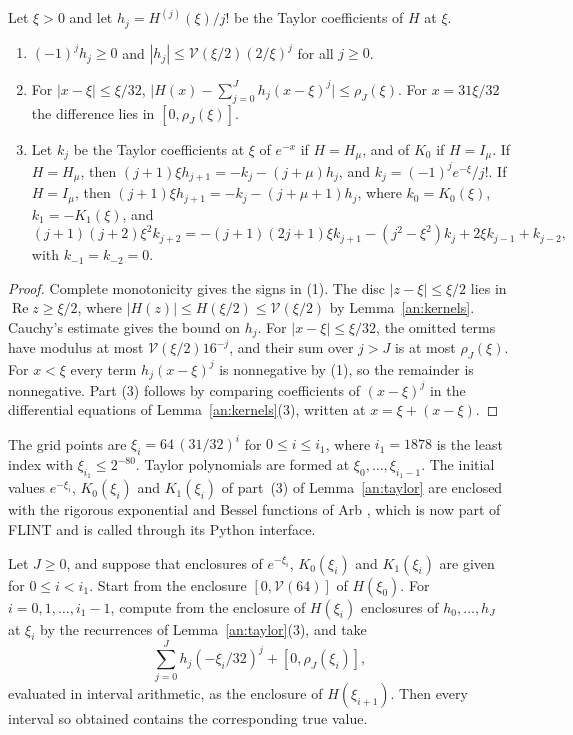\begin{lemma}\label{an:taylor}
Let $\xi>0$ and let $h_j=H^{(j)}(\xi)/j!$ be the Taylor coefficients of $H$
at $\xi$.
\begin{enumerate}
\item $(-1)^jh_j\ge0$ and $|h_j|\le\mathcal V(\xi/2)(2/\xi)^j$ for all
 $j\ge0$.
\item For $|x-\xi|\le\xi/32$,
 $\bigl|H(x)-\sum_{j=0}^Jh_j(x-\xi)^j\bigr|\le\rho_J(\xi)$. For
 $x=31\xi/32$ the difference lies in $[0,\rho_J(\xi)]$.
\item Let $k_j$ be the Taylor coefficients at $\xi$ of $e^{-x}$ if
 $H=H_\mu$, and of $K_0$ if $H=I_\mu$. If $H=H_\mu$, then
 $(j+1)\xi h_{j+1}=-k_j-(j+\mu)h_j$, and $k_j=(-1)^je^{-\xi}/j!$. If
 $H=I_\mu$, then $(j+1)\xi h_{j+1}=-k_j-(j+\mu+1)h_j$, where
 $k_0=K_0(\xi)$, $k_1=-K_1(\xi)$, and
 \[
 (j+1)(j+2)\xi^2k_{j+2}=-(j+1)(2j+1)\xi k_{j+1}-(j^2-\xi^2)k_j
 +2\xi k_{j-1}+k_{j-2},
 \]
 with $k_{-1}=k_{-2}=0$.
\end{enumerate}
\end{lemma}

\begin{proof}
Complete monotonicity gives the signs in (1). The disc $|z-\xi|\le\xi/2$ lies
in $\operatorname{Re}z\ge\xi/2$, where $|H(z)|\le H(\xi/2)\le\mathcal
V(\xi/2)$ by Lemma~\ref{an:kernels}. Cauchy's estimate gives the bound on
$h_j$. For $|x-\xi|\le\xi/32$, the omitted terms have modulus at most
$\mathcal V(\xi/2)16^{-j}$, and their sum over $j>J$ is at most
$\rho_J(\xi)$. For $x<\xi$ every term $h_j(x-\xi)^j$ is nonnegative by (1),
so the remainder is nonnegative. Part (3) follows by comparing coefficients
of $(x-\xi)^j$ in the differential equations of Lemma~\ref{an:kernels}(3),
written at $x=\xi+(x-\xi)$.
\end{proof}

The grid points are $\xi_i=64\,(31/32)^i$ for $0\le i\le i_1$, where
$i_1=1878$ is the least index with $\xi_{i_1}\le2^{-80}$. Taylor polynomials
are formed at $\xi_0,\ldots,\xi_{i_1-1}$. The initial values
$e^{-\xi_i}$, $K_0(\xi_i)$ and $K_1(\xi_i)$ of part~(3) of
Lemma~\ref{an:taylor} are enclosed with the rigorous exponential and Bessel
functions of Arb \cite{Johansson2017}, which is now part of FLINT
\cite{FLINT} and is called through its Python interface.

\begin{lemma}\label{an:grid}
Let $J\ge0$, and suppose that enclosures of $e^{-\xi_i}$, $K_0(\xi_i)$ and
$K_1(\xi_i)$ are given for $0\le i<i_1$. Start from the enclosure
$[0,\mathcal V(64)]$ of $H(\xi_0)$. For $i=0,1,\ldots,i_1-1$, compute from
the enclosure of $H(\xi_i)$ enclosures of $h_0,\ldots,h_J$ at $\xi_i$ by the
recurrences of Lemma~\ref{an:taylor}(3), and take
\[
 \sum_{j=0}^Jh_j(-\xi_i/32)^j+[0,\rho_J(\xi_i)],
\]
evaluated in interval arithmetic, as the enclosure of $H(\xi_{i+1})$. Then
every interval so obtained contains the corresponding true value.
\end{lemma}

